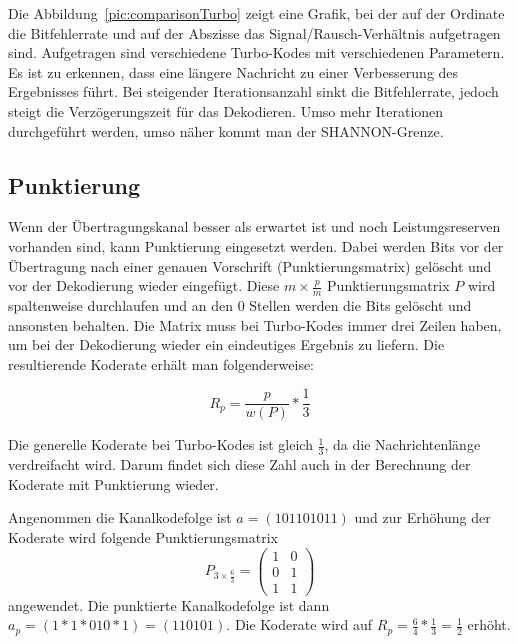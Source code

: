 Die Abbildung~\ref{pic:comparisonTurbo} zeigt eine Grafik, bei der auf der Ordinate die Bitfehlerrate und auf der Abszisse das Signal/Rausch-Verhältnis  aufgetragen sind. Aufgetragen sind verschiedene Turbo-Kodes mit verschiedenen Parametern. Es ist zu erkennen, dass eine längere Nachricht zu einer Verbesserung des Ergebnisses führt. Bei steigender Iterationsanzahl sinkt die Bitfehlerrate, jedoch steigt die Verzögerungszeit für das Dekodieren. Umso mehr Iterationen durchgeführt werden, umso näher kommt man der SHANNON-Grenze.

\FloatBarrier
\subsection{Punktierung}
\label{sec:puncturing}
Wenn der Übertragungskanal besser als erwartet ist und noch Leistungsreserven vorhanden sind, kann Punktierung eingesetzt werden. Dabei werden Bits vor der Übertragung nach einer genauen Vorschrift (Punktierungsmatrix) gelöscht und vor der Dekodierung wieder eingefügt. Diese $m \times \frac{p}{m}$ Punktierungsmatrix $P$  wird spaltenweise durchlaufen und an den 0 Stellen werden die Bits gelöscht und ansonsten behalten. Die Matrix muss bei Turbo-Kodes immer drei Zeilen haben, um bei der Dekodierung wieder ein eindeutiges Ergebnis zu liefern. Die resultierende Koderate erhält man folgenderweise:

\begin{equation}
R_p = \frac{p}{w(P)} * \frac{1}{3}
\end{equation} 

Die generelle Koderate bei Turbo-Kodes ist gleich $\frac{1}{3}$, da die Nachrichtenlänge verdreifacht wird. Darum findet sich diese Zahl auch in der Berechnung der Koderate mit Punktierung wieder. \cite[218]{schoenfeld2012informations}

\begin{e_exa}
Angenommen die Kanalkodefolge ist $a=(101101011)$ und zur Erhöhung der Koderate wird folgende Punktierungsmatrix $$P_{3 \times \frac{6}{3}}=\begin{pmatrix}
1 & 0 \\
0 & 1 \\
1 & 1
\end{pmatrix}$$ angewendet. Die punktierte Kanalkodefolge ist dann $a_p=(1*1*010*1)=(110101)$. Die Koderate wird auf $R_p = \frac{6}{4} * \frac{1}{3} = \frac{1}{2}$ erhöht. 
\end{e_exa}